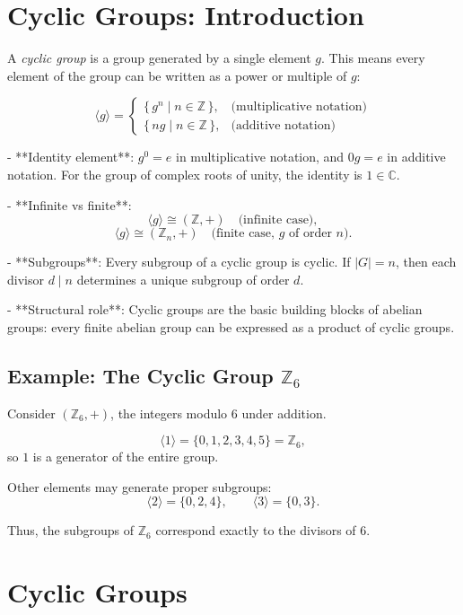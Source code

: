 \documentclass[12pt]{article}
\begin{document}
	
	\section*{Cyclic Groups: Introduction}
	
	A \emph{cyclic group} is a group generated by a single element $g$.  
	This means every element of the group can be written as a power or multiple of $g$:
	
	\[
	\langle g \rangle =
	\begin{cases}
		\{\, g^n \mid n \in \mathbb{Z} \,\}, & \text{(multiplicative notation)} \\[6pt]
		\{\, n g \mid n \in \mathbb{Z} \,\}, & \text{(additive notation)} 
	\end{cases}
	\]
	
	- **Identity element**:  
	$g^0 = e$ in multiplicative notation, and $0g = e$ in additive notation.  
	For the group of complex roots of unity, the identity is $1 \in \mathbb{C}$.
	
	- **Infinite vs finite**:  
	\[
	\langle g \rangle \cong (\mathbb{Z}, +) \quad \text{(infinite case)}, 
	\]
	\[
	\langle g \rangle \cong (\mathbb{Z}_n, +) \quad \text{(finite case, $g$ of order $n$)}.
	\]
	
	- **Subgroups**:  
	Every subgroup of a cyclic group is cyclic.  
	If $|G| = n$, then each divisor $d \mid n$ determines a unique subgroup of order $d$.
	
	- **Structural role**:  
	Cyclic groups are the basic building blocks of abelian groups:  
	every finite abelian group can be expressed as a product of cyclic groups.
	
	\subsection*{Example: The Cyclic Group $\mathbb{Z}_6$}
	
	Consider $(\mathbb{Z}_6, +)$, the integers modulo $6$ under addition.
	
	\[
	\langle 1 \rangle = \{0,1,2,3,4,5\} = \mathbb{Z}_6,
	\]
	so $1$ is a generator of the entire group.
	
	Other elements may generate proper subgroups:
	\[
	\langle 2 \rangle = \{0,2,4\}, \qquad 
	\langle 3 \rangle = \{0,3\}.
	\]
	
	Thus, the subgroups of $\mathbb{Z}_6$ correspond exactly to the divisors of $6$.
	
	
	\section*{Cyclic Groups}
	
\end{document}
